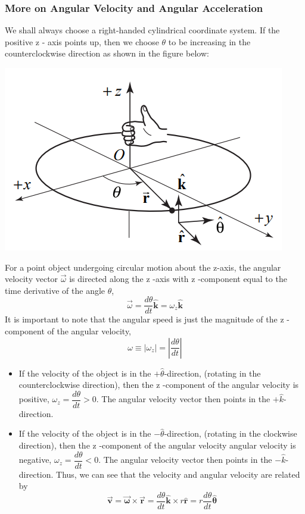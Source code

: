 \documentclass[12pt,addpoints]{exam}
\begin{document}
	\subsubsection*{More on Angular Velocity and Angular Acceleration}
	We shall always choose a right-handed cylindrical coordinate system. If the positive z - axis points up, then we choose $\theta$ to be increasing in the counterclockwise direction as shown in the figure below:
	\begin{center}
		\includegraphics[scale=0.4]{rhr.png}
	\end{center}
	For a point object undergoing circular motion about the z-axis, the angular velocity vector $\vec{\omega}$ is directed along the z -axis with z -component equal to the time derivative of the angle $\theta$,
	$$\vec{\omega}=\frac{d \theta}{d t} \hat{\mathbf{k}}=\omega_{z} \hat{\mathbf{k}}$$
	It is important to note that the angular speed is just the magnitude of the z -component of the angular velocity,
	$$\omega \equiv\left|\omega_{z}\right|=\left|\frac{d \theta}{d t}\right|$$
	\begin{itemize}
		\item If the velocity of the object is in the $+\hat\theta$-direction, (rotating in the counterclockwise direction), then the z -component of the angular velocity is positive, $\omega_{z}=\dfrac{d\theta}{dt}>0$. The angular velocity vector then points in the $+\hat k$-direction. 
		\item If the velocity of the object is in the $-\hat\theta$-direction, (rotating in the clockwise direction), then the z -component of the angular velocity angular velocity is negative, $\omega_{z}=\dfrac{d\theta}{dt}<0$. The angular velocity vector then points in the $-\hat k$-direction.
		Thus, we can see that the velocity and angular velocity are related by
		$$\overrightarrow{\mathbf{v}}=\overrightarrow{\boldsymbol{\omega}} \times \overrightarrow{\mathbf{r}}=\frac{d \theta}{d t} \hat{\mathbf{k}} \times r \hat{\mathbf{r}}=r \frac{d \theta}{d t} \hat{\boldsymbol{\theta}}$$
	\end{itemize}
\end{document}
